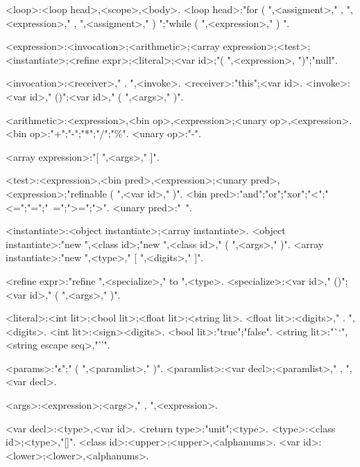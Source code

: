 \begin{grammar}
<loop>:<loop head>,<scope>,<body>.
<loop head>:"for ( ",<assigment>," , ",<expression>," , ",<assigment>," ) ";"while ( ",<expression>," ) ".

<expression>:<invocation>;<arithmetic>;<array expression>;<test>;<instantiate>;<refine expr>;<literal>;<var id>;"( ",<expression>, ")";"null".

<invocation>:<receiver>," . ",<invoke>.
<receiver>:"this";<var id>.
<invoke>:<var id>," ()";<var id>," ( ",<args>," )".

<arithmetic>:<expression>,<bin op>,<expression>;<unary op>,<expression>.
<bin op>:"+";"-";"*";"/";"\%".
<unary op>:"-".

<array expression>:"[ ",<args>," ]".

<test>:<expression>,<bin pred>,<expression>;<unary pred>,<expression>;"refinable ( ",<var id>," )".
<bin pred>:"and";"or";"xor";"<";"<=";"=";"~=";">=";">".
<unary pred>:"~".

<instantiate>:<object instantiate>;<array instantiate>.
<object instantiate>:"new ",<class id>;"new ",<class id>," ( ",<args>," )".
<array instantiate>:"new ",<type>," [ ",<digits>," ]".

<refine expr>:"refine ",<specialize>," to ",<type>.
<specialize>:<var id>," ()";<var id>," ( ",<args>," )".

<literal>:<int lit>;<bool lit>;<float lit>;<string lit>.
<float lit>:<digits>," . ",<digits>.
<int lit>:<sign><digits>.
<bool lit>:"true";"false".
<string lit>:"``",<string escape seq>,"''".

<params>:"$\epsilon$";" ( ",<paramlist>," )".
<paramlist>:<var decl>;<paramlist>," , ",<var decl>.

<args>:<expression>;<args>," , ",<expression>.

<var decl>:<type>,<var id>.
<return type>:"unit";<type>.
<type>:<class id>;<type>,"[]".
<class id>:<upper>;<upper>,<alphanums>.
<var id>:<lower>;<lower>,<alphanums>.

\end{grammar}
